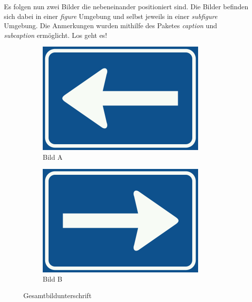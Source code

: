 \documentclass{scrreprt}
\begin{document}
Es folgen nun zwei Bilder die nebeneinander positioniert sind. Die Bilder befinden sich dabei
in einer \textit{figure} Umgebung und selbst jeweils in einer \textit{subfigure} Umgebung. Die Anmerkungen wurden mithilfe des Paketes \textit{caption} und \textit{subcaption} ermöglicht. Los geht es!
\vspace{10pt}
\begin{figure}[h!]
	\centering
	\begin{subfigure}{.5\textwidth}
		\centering
		\includegraphics[width=.9\linewidth]{images/Nederlands_verkeersbord_C4_(links).png}
		\caption{Bild A}
		
	\end{subfigure}%
	\begin{subfigure}{.5\textwidth}
		\centering
		\includegraphics[width=.9\linewidth]{images/Nederlands_verkeersbord_C4_(rechts).png}
		\caption{Bild B}
		
	\end{subfigure}
	\caption{Gesamtbildunterschrift}

\end{figure}
\end{document}
